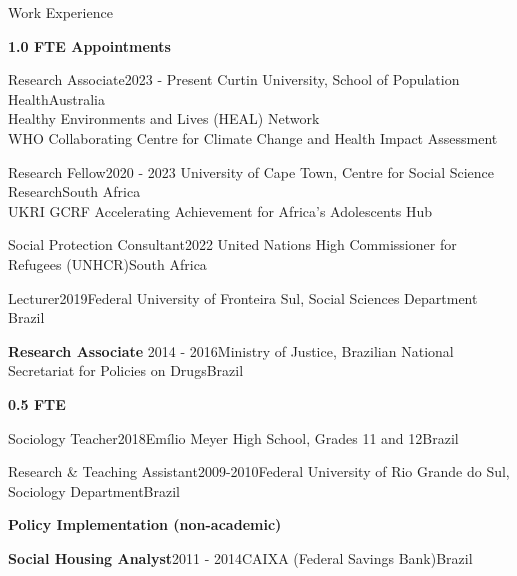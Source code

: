 \begin{rSection}{Work Experience}

\large \diamondsep{} \textbf {1.0 FTE Appointments}

\begin{rSubsection}
{Research Associate}{2023 - Present}
{Curtin University, School of Population Health}{Australia}\\
Healthy Environments and Lives (HEAL) Network\\
WHO Collaborating Centre for Climate Change and Health Impact Assessment
\end{rSubsection}

\begin{rSubsection}
{Research Fellow}{2020 - 2023}
{University of Cape Town, Centre for Social Science Research}{South Africa}\\
UKRI GCRF Accelerating Achievement for Africa's Adolescents Hub
\end{rSubsection}

\begin{rSubsection}
{Social Protection Consultant}{2022}
{United Nations High Commissioner for Refugees (UNHCR)}{South Africa}\par
\end{rSubsection}

\begin{rSubsection}{Lecturer}{2019}{Federal University of Fronteira Sul, Social Sciences Department} {Brazil}\par
\end{rSubsection}

\begin{rSubsection}{\textbf{Research Associate}}{ 2014 - 2016}{Ministry of Justice, Brazilian National Secretariat for Policies on Drugs}{Brazil}\par
\end{rSubsection}

\vspace{1em}
\large \diamondsep{} \textbf {0.5 FTE}
\par

\begin{rSubsection}{Sociology Teacher}{2018}{Emílio Meyer High School, Grades 11 and 12}{Brazil}\par
\end{rSubsection}

\begin{rSubsection}{Research \& Teaching Assistant}{2009-2010}{Federal University of Rio Grande do Sul, Sociology Department}{Brazil}\par
\end{rSubsection}

\vspace{1em}
\large  \diamondsep{}\textbf{Policy Implementation (non-academic)}
\par

\begin{rSubsection}{\textbf{Social Housing Analyst}}{2011 -  2014}{CAIXA (Federal Savings Bank)}{Brazil}\par
\end{rSubsection}

\end{rSection}